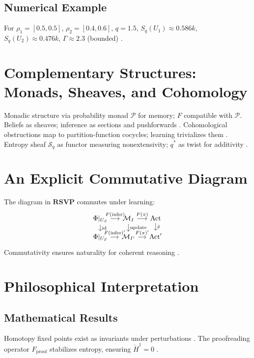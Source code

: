 \documentclass{article}
\theoremstyle{plain}
\theoremstyle{definition}
\begin{document}
\subsection{Numerical Example}
For $\rho_1 = [0.5, 0.5]$, $\rho_2 = [0.4, 0.6]$, $q=1.5$, $S_q(U_1) \approx 0.586k$, $S_q(U_2) \approx 0.476k$, $\Gamma \approx 2.3$ (bounded) \cite{Soares2024}.

\section{Complementary Structures: Monads, Sheaves, and Cohomology}

Monadic structure via probability monad $\mathcal{P}$ for memory; $F$ compatible with $\mathcal{P}$. Beliefs as sheaves; inference as sections and pushforwards \cite{MacLane1992,Goguen1992}. Cohomological obstructions map to partition-function cocycles; learning trivializes them \cite{Soares2024,Tsallis1988}. Entropy sheaf $\mathcal{S}_q$ as functor measuring nonextensivity; $q^*$ as twist for additivity \cite{Soares2023physica}.

\section{An Explicit Commutative Diagram}

The diagram in $\mathbf{RSVP}$ commutes under learning:
\[
\begin{tikzcd}[scale=0.6, column sep=small, row sep=small, every node/.style={font=\small}, ampersand replacement=\&]
\Phi|_{U_S} \arrow[r, "F(\text{infer})"] \arrow[d, "\text{id}"] \& \mathcal{M}_I \arrow[r, "F(\pi)"] \arrow[d, "\text{update}"] \& \text{Act} \arrow[d, "\delta"] \\
\Phi|_{U_S} \arrow[r, "F(\text{infer})'"] \& \mathcal{M}_{I'} \arrow[r, "F(\pi)'"] \& \text{Act}'
\end{tikzcd}
\]
Commutativity ensures naturality for coherent reasoning \cite{Spivak2014}.

\section{Philosophical Interpretation}

\subsection{Mathematical Results}
Homotopy fixed points exist as invariants under perturbations \cite{Awodey2010}. The proofreading operator $F_\text{proof}$ stabilizes entropy, ensuring $\check{H}^1 = 0$ \cite{Liang2025}.
\end{document}
